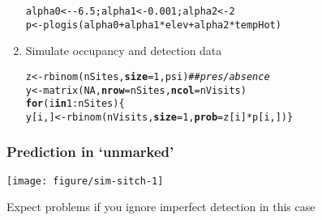 \documentclass[color=usenames,dvipsnames]{beamer}\usepackage[]{graphicx}\usepackage[]{xcolor}
\makeatletter
\newcommand{\hlnum}[1]{\textcolor[rgb]{0.69,0.494,0}{#1}}%
\newcommand{\hlcom}[1]{\textcolor[rgb]{0.514,0.506,0.514}{\textit{#1}}}%
\newcommand{\hlopt}[1]{\textcolor[rgb]{0,0,0}{#1}}%
\newcommand{\hldef}[1]{\textcolor[rgb]{0,0,0}{#1}}%
\newcommand{\hlkwa}[1]{\textcolor[rgb]{0,0,0}{\textbf{#1}}}%
\newcommand{\hlkwb}[1]{\textcolor[rgb]{0,0.341,0.682}{#1}}%
\newcommand{\hlkwc}[1]{\textcolor[rgb]{0,0,0}{\textbf{#1}}}%
\newcommand{\hlkwd}[1]{\textcolor[rgb]{0.004,0.004,0.506}{#1}}%
\newenvironment{kframe}{%
 \def\at@end@of@kframe{}%
 \ifinner\ifhmode%
  \def\at@end@of@kframe{\end{minipage}}%
  \begin{minipage}{\columnwidth}%
 \fi\fi%
 \def\FrameCommand##1{\hskip\@totalleftmargin \hskip-\fboxsep
 \colorbox{shadecolor}{##1}\hskip-\fboxsep
     \hskip-\linewidth \hskip-\@totalleftmargin \hskip\columnwidth}%
 \MakeFramed {\advance\hsize-\width
   \@totalleftmargin\z@ \linewidth\hsize
   \@setminipage}}%
 {\par\unskip\endMakeFramed%
 \at@end@of@kframe}
\newenvironment{knitrout}{}{} %
\makeatother
\begin{document}
\begin{frame}[fragile]
\begin{enumerate}[<+->]
\begin{knitrout}
\begin{kframe}
\begin{alltt}
\hldef{alpha0} \hlkwb{<-} \hlopt{-}\hlnum{6.5}\hldef{; alpha1} \hlkwb{<-} \hlnum{0.001}\hldef{; alpha2} \hlkwb{<-} \hlnum{2}
\hldef{p} \hlkwb{<-} \hlkwd{plogis}\hldef{(alpha0} \hlopt{+} \hldef{alpha1}\hlopt{*}\hldef{elev} \hlopt{+} \hldef{alpha2}\hlopt{*}\hldef{tempHot)}
\end{alltt}
\end{kframe}
\end{knitrout}
  \item Simulate occupancy and detection data
\begin{knitrout}\scriptsize
{}\color{fgcolor}\begin{kframe}
\begin{alltt}
\hldef{z} \hlkwb{<-} \hlkwd{rbinom}\hldef{(nSites,} \hlkwc{size}\hldef{=}\hlnum{1}\hldef{, psi)}            \hlcom{## pres/absence}
\hldef{y} \hlkwb{<-} \hlkwd{matrix}\hldef{(}\hlnum{NA}\hldef{,} \hlkwc{nrow}\hldef{=nSites,} \hlkwc{ncol}\hldef{=nVisits)}
\hlkwa{for}\hldef{(i} \hlkwa{in} \hlnum{1}\hlopt{:}\hldef{nSites) \{}
    \hldef{y[i,]} \hlkwb{<-} \hlkwd{rbinom}\hldef{(nVisits,} \hlkwc{size}\hldef{=}\hlnum{1}\hldef{,} \hlkwc{prob}\hldef{=z[i]}\hlopt{*}\hldef{p[i,]) \}}
\end{alltt}
\end{kframe}
\end{knitrout}
\end{enumerate}
\end{frame}




\begin{frame}[fragile]
  \frametitle{Prediction in `unmarked'}
\begin{knitrout}\tiny
{}\color{fgcolor}

{\centering \texttt{[image: figure/sim-sitch-1]} 

}


\end{knitrout}
\footnotesize
\centering
Expect problems if you ignore imperfect detection in this case \\
\end{frame}
\end{document}
